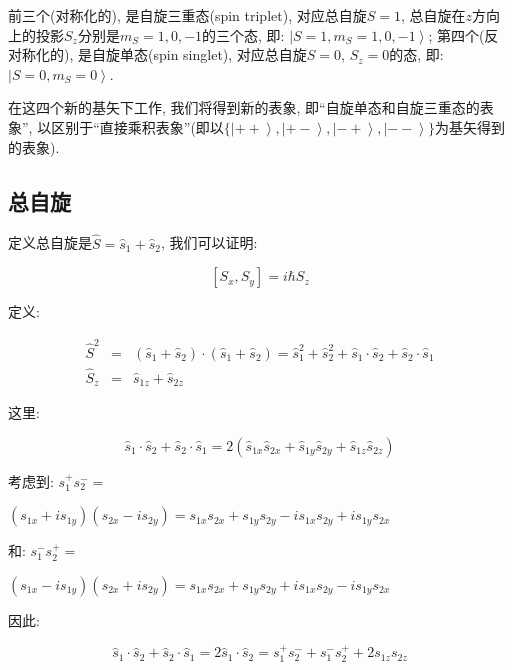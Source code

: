 前三个(对称化的), 是自旋三重态(spin triplet), 对应总自旋$S=1$, 总自旋在$z$方向上的投影$S_z$分别是$m_S =1,0,-1$的三个态, 即: $\left|S=1,m_S=1, 0, -1 \right\rangle$; 第四个(反对称化的),
是自旋单态(spin singlet), 对应总自旋$S=0$, $S_z=0$的态, 即: $\left|S=0, m_S=0 \right\rangle$.

在这四个新的基矢下工作, 我们将得到新的表象,
即``自旋单态和自旋三重态的表象'',
以区别于``直接乘积表象''(即以$\{\left| {++} \right\rangle, \left|
{+-} \right\rangle, \left| {-+} \right\rangle, \left| {--}
\right\rangle \}$为基矢得到的表象).

\subsection{总自旋}


定义总自旋是$\hat S = \hat s_1 + \hat s_2$, 我们可以证明:


\begin{equation}\label{spin commutation}
\left[ S_x, S_y \right] = i \hbar S_z
\end{equation}

定义:

\begin{eqnarray*}
\hat S^2 &=& ( \hat s_1 + \hat s_2 ) \cdot ( \hat s_1 + \hat s_2 ) =
\hat s_1^2 + \hat
s_2^2 + \hat s_1 \cdot \hat s_2 + \hat s_2 \cdot \hat s_1 \\
\hat S_z  &=&  \hat s_{1z} + \hat s_{2z}
\end{eqnarray*}

这里:

\begin{equation*}
\hat s_1 \cdot \hat s_2 + \hat s_2 \cdot \hat s_1= 2\left( \hat
s_{1x}\hat s_{2x} + \hat s_{1y} \hat s_{2y} + \hat s_{1z} \hat
s_{2z} \right)
\end{equation*}


考虑到: $s_1^+ s_2^- =$

$\left( s_{1x} + i s_{1y}  \right) \left( s_{2x} - i s_{2y} \right)
= s_{1x}s_{2x} + s_{1y}s_{2y} -is_{1x}s_{2y} + is_{1y}s_{2x}$

和: $s_1^- s_2^+ =$

$\left( s_{1x} - i s_{1y}  \right) \left( s_{2x} + i s_{2y} \right)
= s_{1x}s_{2x} + s_{1y}s_{2y} + is_{1x}s_{2y} - is_{1y}s_{2x}$


因此:

\begin{equation*}
\hat s_1 \cdot \hat s_2 + \hat s_2 \cdot \hat s_1 = 2 \hat s_1 \cdot
\hat s_2 = s_1^+ s_2^- + s_1^- s_2^+ + 2s_{1z}s_{2z}
\end{equation*}


